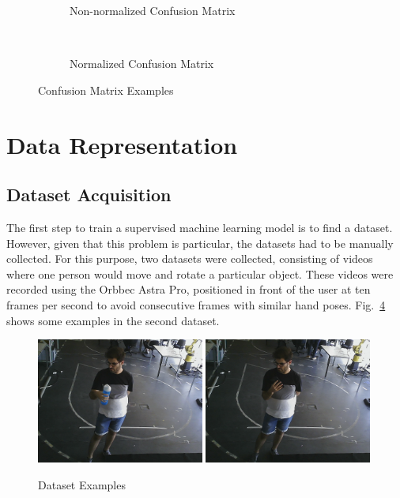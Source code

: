 \begin{figure}[H]
    \centering
    \begin{subfigure}[b]{0.48\textwidth}
        {\fontsize{10}{12}\selectfont}
        \caption{Non-normalized Confusion Matrix}
        \label{fig:non-norm_conf_matrix}
    \end{subfigure} \
    \begin{subfigure}[b]{0.48\textwidth}
        {\fontsize{10}{12}\selectfont}
        \caption{Normalized Confusion Matrix}
        \label{fig:norm_conf_matrix}
    \end{subfigure}
    \caption[Confusion Matrix Examples]{Confusion Matrix Examples}
    \label{fig:conf_matrix_examples}
\end{figure}

\section{Data Representation}

\subsection{Dataset Acquisition}

The first step to train a supervised machine learning model is to find a dataset. However, given that this problem is particular, the datasets had to be manually collected. For this purpose, two datasets were collected, consisting of videos where one person would move and rotate a particular object. These videos were recorded using the Orbbec Astra Pro, positioned in front of the user at ten frames per second to avoid consecutive frames with similar hand poses. Fig.~\ref{fig:dataset_examples} shows some examples in the second dataset.

\begin{figure}[H]
    \centerline{\includegraphics[width=0.49\textwidth]{figs/dataset_preprocessing1_1.png} \includegraphics[width=0.49\textwidth]{figs/dataset_preprocessing1_2.png}}
    \caption[Dataset Examples]{Dataset Examples}
    \label{fig:dataset_examples}
\end{figure}

